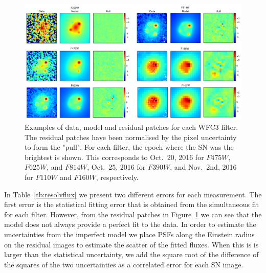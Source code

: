 \documentclass[a4paper,fleqn,usenatbib]{mnras}
\newcommand{\sn}{SN\xspace}
\newcommand{\wfc}{WFC3\xspace}
\newcommand{\wfcuvis}{WFC3/UVIS\xspace}
\newcommand{\wfcir}{WFC3/IR\xspace}
\newcommand{\jband}{{\it J}\xspace}
\newcommand{\hstu}{$F390W$\xspace}
\newcommand{\hstb}{$F475W$\xspace}
\newcommand{\hstr}{$F625W$\xspace}
\newcommand{\hsti}{$F814W$\xspace}
\newcommand{\hstj}{$F110W$\xspace}
\newcommand{\hsth}{$F160W$\xspace}
\begin{document}
\begin{figure}
	\centering
	\caption{%
		Examples of data, model and residual patches for each \wfc filter.  The residual patches have been normalised by the 
		pixel uncertainty to form the "pull".  For each filter, the epoch where the \sn was the brightest is shown.  This corresponds
		to Oct.~20, 2016 for \hstb, \hstr, and \hsti, Oct.~25, 2016 for \hstu, and Nov.~2nd, 2016 for \hstj and \hsth, respectively.
	\label{fig:wfcforward}}
	\includegraphics[width=\textwidth]{wfc3_patches_v2.pdf}
\end{figure}

%  

In Table~\ref{tb:resolvflux} we present two different errors for each measurement.  The first error is the statistical fitting error that is obtained 
from the simultaneous fit for each filter.  However, from the residual patches in Figure~\ref{fig:wfcforward} we can 
see that the model does not always provide a perfect fit to the data.  In order to estimate the uncertainties from the imperfect model we 
place PSFs along the Einstein radius on the residual images to estimate the scatter of the fitted fluxes.  When this is is larger than the statistical uncertainty, we add the square root of the difference of the squares of the two uncertainties as a correlated error for each \sn image.
\end{document}
